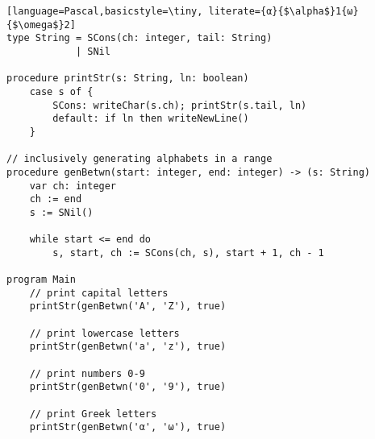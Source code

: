 \documentclass{beamer}
\begin{document}
\begin{lrbox}{\exampleString}
\begin{lstlisting}[language=Pascal,basicstyle=\tiny, literate={α}{$\alpha$}1{ω}{$\omega$}2]
type String = SCons(ch: integer, tail: String)
            | SNil

procedure printStr(s: String, ln: boolean)
    case s of {
        SCons: writeChar(s.ch); printStr(s.tail, ln)
        default: if ln then writeNewLine()
    }

// inclusively generating alphabets in a range
procedure genBetwn(start: integer, end: integer) -> (s: String)
    var ch: integer
    ch := end
    s := SNil()
    
    while start <= end do
        s, start, ch := SCons(ch, s), start + 1, ch - 1

program Main
    // print capital letters
    printStr(genBetwn('A', 'Z'), true)
    
    // print lowercase letters
    printStr(genBetwn('a', 'z'), true)
    
    // print numbers 0-9
    printStr(genBetwn('0', '9'), true)
    
    // print Greek letters
    printStr(genBetwn('α', 'ω'), true)

\end{lstlisting}
\end{lrbox}
\end{document}
